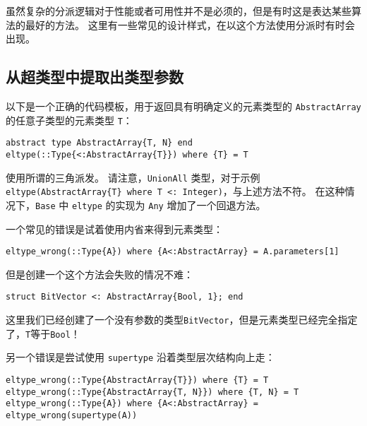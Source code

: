 虽然复杂的分派逻辑对于性能或者可用性并不是必须的，但是有时这是表达某些算法的最好的方法。 这里有一些常见的设计样式，在以这个方法使用分派时有时会出现。



\hypertarget{13813570673284607064}{}


\subsection{从超类型中提取出类型参数}



以下是一个正确的代码模板，用于返回具有明确定义的元素类型的 \texttt{AbstractArray} 的任意子类型的元素类型 \texttt{T}：




\begin{verbatim}
abstract type AbstractArray{T, N} end
eltype(::Type{<:AbstractArray{T}}) where {T} = T
\end{verbatim}



使用所谓的三角派发。 请注意，\texttt{UnionAll} 类型，对于示例\texttt{eltype(AbstractArray\{T\} where T <: Integer)}，与上述方法不符。 在这种情况下，\texttt{Base} 中 \texttt{eltype} 的实现为 \texttt{Any} 增加了一个回退方法。



一个常见的错误是试着使用内省来得到元素类型：




\begin{verbatim}
eltype_wrong(::Type{A}) where {A<:AbstractArray} = A.parameters[1]
\end{verbatim}



但是创建一个这个方法会失败的情况不难：




\begin{verbatim}
struct BitVector <: AbstractArray{Bool, 1}; end
\end{verbatim}



这里我们已经创建了一个没有参数的类型\texttt{BitVector}，但是元素类型已经完全指定了，\texttt{T}等于\texttt{Bool}！



另一个错误是尝试使用 \texttt{supertype} 沿着类型层次结构向上走：




\begin{verbatim}
eltype_wrong(::Type{AbstractArray{T}}) where {T} = T
eltype_wrong(::Type{AbstractArray{T, N}}) where {T, N} = T
eltype_wrong(::Type{A}) where {A<:AbstractArray} = eltype_wrong(supertype(A))
\end{verbatim}



